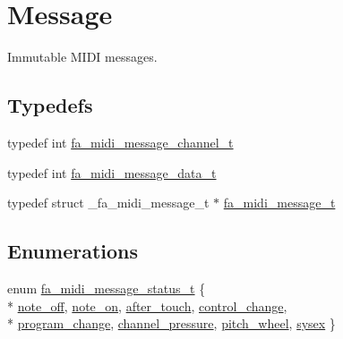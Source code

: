 \hypertarget{group___fa_midi_message}{\section{Message}
\label{group___fa_midi_message}
}


Immutable M\-I\-D\-I messages.  


\subsection*{Typedefs}
\begin{DoxyCompactItemize}
\item 
typedef int \hyperlink{group___fa_midi_message_gae7fc48e105b9bec5500bc422231a1159}{fa\-\_\-midi\-\_\-message\-\_\-channel\-\_\-t}
\item 
typedef int \hyperlink{group___fa_midi_message_gadc3c487a2892db5309395922f92e8d28}{fa\-\_\-midi\-\_\-message\-\_\-data\-\_\-t}
\item 
typedef struct \-\_\-fa\-\_\-midi\-\_\-message\-\_\-t $\ast$ \hyperlink{group___fa_midi_message_gaa73293eb40a2cffdc2294e3cb6dc2564}{fa\-\_\-midi\-\_\-message\-\_\-t}
\end{DoxyCompactItemize}
\subsection*{Enumerations}
\begin{DoxyCompactItemize}
\item 
enum \hyperlink{group___fa_midi_message_gaf34878eefb2ec676b7894176528d5b05}{fa\-\_\-midi\-\_\-message\-\_\-status\-\_\-t} \{ \\*
\hyperlink{group___fa_midi_message_ggaf34878eefb2ec676b7894176528d5b05aca154ab360fdd6f9578d9a301d634bcb}{note\-\_\-off}, 
\hyperlink{group___fa_midi_message_ggaf34878eefb2ec676b7894176528d5b05aa3aad707828be70a9dad4f256c1a0a28}{note\-\_\-on}, 
\hyperlink{group___fa_midi_message_ggaf34878eefb2ec676b7894176528d5b05a6586f26d582b52e7f4c3bd4fd32bf814}{after\-\_\-touch}, 
\hyperlink{group___fa_midi_message_ggaf34878eefb2ec676b7894176528d5b05ab6bf71590067f051c8e0c3c7e114442c}{control\-\_\-change}, 
\\*
\hyperlink{group___fa_midi_message_ggaf34878eefb2ec676b7894176528d5b05ab4d364a14ba45bcc49464e6e5e4cc60e}{program\-\_\-change}, 
\hyperlink{group___fa_midi_message_ggaf34878eefb2ec676b7894176528d5b05ae5e28da496463f48ff30c639c8a54950}{channel\-\_\-pressure}, 
\hyperlink{group___fa_midi_message_ggaf34878eefb2ec676b7894176528d5b05ac5197e881e3d9989c62d322e63c0affe}{pitch\-\_\-wheel}, 
\hyperlink{group___fa_midi_message_ggaf34878eefb2ec676b7894176528d5b05a2868e44729ef465f8774fb5bd3947fca}{sysex}
 \}
\end{DoxyCompactItemize}
